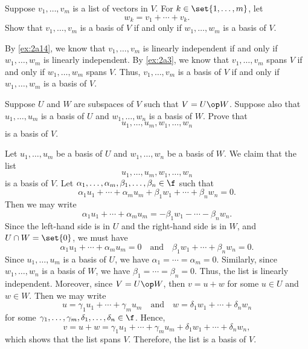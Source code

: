 \begin{exercise}[2b9]
    Suppose $v_1, \ldots, v_m$ is a list of vectors in $V$. For $k \in \set{1, \ldots, m}$, let
    \[w_k = v_1 + \cdots + v_k.\]
    Show that $v_1, \ldots, v_m$ is a basis of $V$ if and only if $w_1, \ldots, w_m$ is a basis of $V$.
\end{exercise}

\begin{sol}
    By \autoref{ex:2a14}, we know that $v_1, \ldots, v_m$ is linearly independent if and only if $w_1, \ldots, w_m$ is linearly independent. By \autoref{ex:2a3}, we know that $v_1, \ldots, v_m$ spans $V$ if and only if $w_1, \ldots, w_m$ spans $V$. Thus, $v_1, \ldots, v_m$ is a basis of $V$ if and only if $w_1, \ldots, w_m$ is a basis of $V$.
\end{sol}

\begin{exercise}[2b10]
    Suppose $U$ and $W$ are subspaces of $V$ such that $V = U \op W$. Suppose also that $u_1, \ldots, u_m$ is a basis of $U$ and $w_1, \ldots, w_n$ is a basis of $W$. Prove that
    \[u_1, \ldots, u_m, w_1, \ldots, w_n\]
    is a basis of $V$.
\end{exercise}

\begin{sol}
    Let $u_1, \ldots, u_m$ be a basis of $U$ and $w_1, \ldots, w_n$ be a basis of $W$. We claim that the list
    \[u_1, \ldots, u_m, w_1, \ldots, w_n\]
    is a basis of $V$. Let $\alpha_1, \ldots, \alpha_m, \beta_1, \ldots, \beta_n \in \f$ such that
    \[\alpha_1 u_1 + \cdots + \alpha_m u_m + \beta_1 w_1 + \cdots + \beta_n w_n = 0.\]
    Then we may write
    \[\alpha_1 u_1 + \cdots + \alpha_m u_m = -\beta_1 w_1 - \cdots - \beta_n w_n.\]
    Since the left-hand side is in $U$ and the right-hand side is in $W$, and $U \cap W = \set{0}$, we must have
    \[\alpha_1 u_1 + \cdots + \alpha_m u_m = 0 \quad \text{and} \quad \beta_1 w_1 + \cdots + \beta_n w_n = 0.\]
    Since $u_1, \ldots, u_m$ is a basis of $U$, we have $\alpha_1 = \cdots = \alpha_m = 0$. Similarly, since $w_1, \ldots, w_n$ is a basis of $W$, we have $\beta_1 = \cdots = \beta_n = 0$. Thus, the list is linearly independent. Moreover, since $V = U \op W$, then $v = u + w$ for some $u \in U$ and $w \in W$. Then we may write
    \[u = \gamma_1 u_1 + \cdots + \gamma_m u_m \quad \text{and} \quad w = \delta_1 w_1 + \cdots + \delta_n w_n\]
    for some $\gamma_1, \ldots, \gamma_m, \delta_1, \ldots, \delta_n \in \f$. Hence,
    \[v = u + w = \gamma_1 u_1 + \cdots + \gamma_m u_m + \delta_1 w_1 + \cdots + \delta_n w_n,\]
    which shows that the list spans $V$. Therefore, the list is a basis of $V$.
\end{sol}


